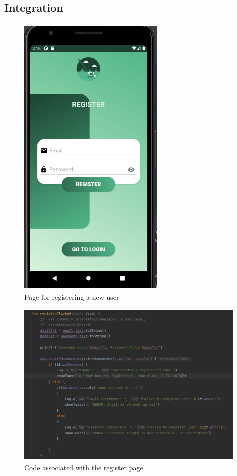 \subsection{Integration}
\begin{figure}[H]
    \centering
    \includegraphics[width=7cm, height = 14cm]{img/registerPage.PNG}
    \caption{Page for registering a new user}
    \label{fig:altas config}
\end{figure}
\begin{figure}[H]
    \centering
    \includegraphics[width=11cm, height= 8cm]{img/registerCode.PNG}
    \caption{Code associated with the register page}
    \label{fig:altas config}
\end{figure}
